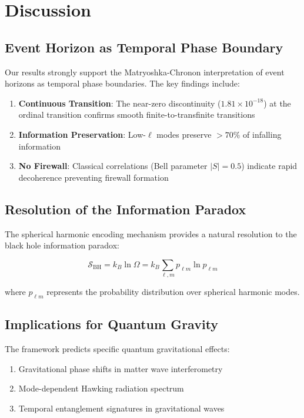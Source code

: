 \documentclass[12pt,a4paper]{article}
\begin{document}
\section{Discussion}

\subsection{Event Horizon as Temporal Phase Boundary}

Our results strongly support the Matryoshka-Chronon interpretation of event horizons as temporal phase boundaries. The key findings include:

\begin{enumerate}
\item \textbf{Continuous Transition}: The near-zero discontinuity ($1.81 \times 10^{-18}$) at the ordinal transition confirms smooth finite-to-transfinite transitions
\item \textbf{Information Preservation}: Low-$\ell$ modes preserve $>70\%$ of infalling information
\item \textbf{No Firewall}: Classical correlations (Bell parameter $|S| = 0.5$) indicate rapid decoherence preventing firewall formation
\end{enumerate}

\subsection{Resolution of the Information Paradox}

The spherical harmonic encoding mechanism provides a natural resolution to the black hole information paradox:

\begin{equation}
\mathcal{S}_{\text{BH}} = k_B \ln \Omega = k_B \sum_{\ell,m} p_{\ell m} \ln p_{\ell m}
\end{equation}

where $p_{\ell m}$ represents the probability distribution over spherical harmonic modes.

\subsection{Implications for Quantum Gravity}

The framework predicts specific quantum gravitational effects:

\begin{enumerate}
\item Gravitational phase shifts in matter wave interferometry
\item Mode-dependent Hawking radiation spectrum
\item Temporal entanglement signatures in gravitational waves
\end{enumerate}
\end{document}
